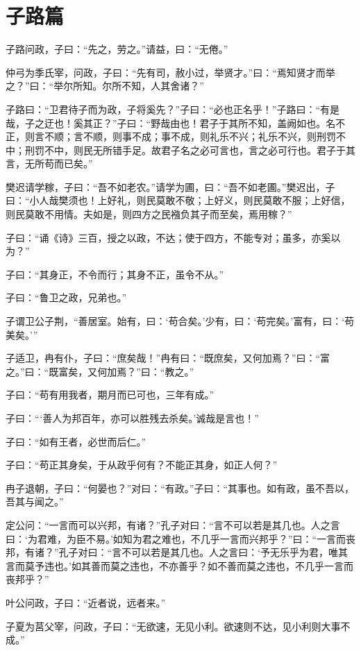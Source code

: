 \documentclass[12pt,a4paper]{ctexbook}
\begin{document}
\section{子路篇}
子路问政，子曰：“先之，劳之。”请益，曰：“无倦。”\par
仲弓为季氏宰，问政，子曰：“先有司，赦小过，举贤才。”曰：“焉知贤才而举之？”曰：“举尔所知。尔所不知，人其舍诸？”\par
子路曰：“卫君待子而为政，子将奚先？”子曰：“必也正名乎！”子路曰：“有是哉，子之迂也！奚其正？”子曰：“野哉由也！君子于其所不知，盖阙如也。名不正，则言不顺；言不顺，则事不成；事不成，则礼乐不兴；礼乐不兴，则刑罚不中；刑罚不中，则民无所错手足。故君子名之必可言也，言之必可行也。君子于其言，无所苟而已矣。”\par
樊迟请学稼，子曰：“吾不如老农。”请学为圃，曰：“吾不如老圃。”樊迟出，子曰：“小人哉樊须也！上好礼，则民莫敢不敬；上好义，则民莫敢不服；上好信，则民莫敢不用情。夫如是，则四方之民襁负其子而至矣，焉用稼？”\par
子曰：“诵《诗》三百，授之以政，不达；使于四方，不能专对；虽多，亦奚以为？”\par
子曰：“其身正，不令而行；其身不正，虽令不从。”\par
子曰：“鲁卫之政，兄弟也。”\par
子谓卫公子荆，“善居室。始有，曰：‘苟合矣。’少有，曰：‘苟完矣。’富有，曰：‘苟美矣。’”\par
子适卫，冉有仆，子曰：“庶矣哉！”冉有曰：“既庶矣，又何加焉？”曰：“富之。”曰：“既富矣，又何加焉？”曰：“教之。”\par
子曰：“苟有用我者，期月而已可也，三年有成。”\par
子曰：“‘善人为邦百年，亦可以胜残去杀矣。’诚哉是言也！”\par
子曰：“如有王者，必世而后仁。”\par
子曰：“苟正其身矣，于从政乎何有？不能正其身，如正人何？”\par
冉子退朝，子曰：“何晏也？”对曰：“有政。”子曰：“其事也。如有政，虽不吾以，吾其与闻之。”\par
定公问：“一言而可以兴邦，有诸？”孔子对曰：“言不可以若是其几也。人之言曰：‘为君难，为臣不易。’如知为君之难也，不几乎一言而兴邦乎？”曰：“一言而丧邦，有诸？”孔子对曰：“言不可以若是其几也。人之言曰：‘予无乐乎为君，唯其言而莫予违也。’如其善而莫之违也，不亦善乎？如不善而莫之违也，不几乎一言而丧邦乎？”\par
叶公问政，子曰：“近者说，远者来。”\par
子夏为莒父宰，问政，子曰：“无欲速，无见小利。欲速则不达，见小利则大事不成。”\par
\end{document}
